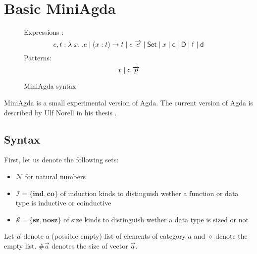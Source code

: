 \chapter{Basic MiniAgda}

\newcommand{\dd}{\mathsf{d}}
\newcommand{\DD}{\mathsf{D}}
\newcommand{\cc}{\mathsf{c}}
\newcommand{\ff}{\mathsf{f}}

\newcommand{\cll}{\mathcal{L}}
\newcommand{\cdd}{\mathcal{D}}
\newcommand{\ccc}{\mathcal{C}}
\newcommand{\cff}{\mathcal{F}}
\newcommand{\cV}{\mathcal{V}}

\newcommand{\cS}{\mathcal{S}}
\newcommand{\cN}{\mathcal{N}}
\newcommand{\cI}{\mathcal{I}}

\newcommand{\sz}{\mathbf{sz}}
\newcommand{\ns}{\mathbf{nosz}}
\newcommand{\co}{\mathbf{co}}
\newcommand{\ind}{\mathbf{ind}}

\newcommand{\Expr}{\mathrm{Expr}}
\newcommand{\Val}{\mathrm{Val}}
\newcommand{\Clause}{\mathrm{Clause}}
\newcommand{\Decl}{\mathrm{Decl}}
\newcommand{\Pat}{\mathrm{Pat}}
\newcommand{\Env}{\mathrm{Env}}

\newcommand{\Sig}{\Sigma\;}

\begin{figure}[p]
\caption{MiniAgda syntax}
Expressions : \[e,t :  \lam x . e \vsp \EPi{x}{t}{t} \vsp e \; \vec{e} \vsp  \Set \vsp x \vsp \cc \vsp \DD \vsp \ff \vsp \dd\]
Patterns: \[ x  \vsp \cc \; \vec{p} \]
\end{figure}

MiniAgda is a small experimental version of Agda.
The current version of Agda is described by Ulf Norell in his thesis \cite{norell:thesis}.



\section{Syntax}

First, let us denote the following sets:
\begin{itemize}
\item
$ \cN $ for natural numbers
\item
$ \cI = \{ \ind , \co \} $ of induction kinds to distinguish wether a function or data type is 
inductive or coinductive  
\item
$ \cS = \{ \sz, \ns \} $ of size kinds to distinguish wether a data type is sized or not
\end{itemize}

Let $\vec{a}$ denote a (possible empty) list of elements of category $a$
and $\diamond$ denote the empty list. $\#\vec{a}$ denotes the size of vector $\vec{a}$.

